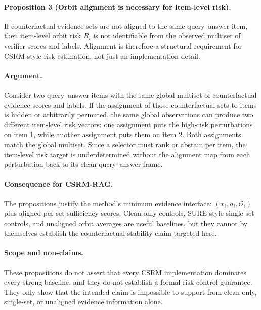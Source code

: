 \paragraph{Proposition 3 (Orbit alignment is necessary for item-level risk).}
\label{prop:orbit-alignment-necessary}
If counterfactual evidence sets are not aligned to the same query--answer item,
then item-level orbit risk $R_i$ is not identifiable from the observed multiset
of verifier scores and labels.  Alignment is therefore a structural requirement
for CSRM-style risk estimation, not just an implementation detail.

\paragraph{Argument.}
Consider two query--answer items with the same global multiset of
counterfactual evidence scores and labels.  If the assignment of those
counterfactual sets to items is hidden or arbitrarily permuted, the same global
observations can produce two different item-level risk vectors: one assignment
puts the high-risk perturbations on item 1, while another assignment puts them
on item 2.  Both assignments match the global multiset.  Since a selector must
rank or abstain per item, the item-level risk target is underdetermined without
the alignment map from each perturbation back to its clean query--answer frame.

\paragraph{Consequence for CSRM-RAG.}
The propositions justify the method's minimum evidence interface:
$(x_i,a_i,\mathcal{O}_i)$ plus aligned per-set sufficiency scores.  Clean-only
controls, SURE-style single-set controls, and unaligned orbit averages are useful
baselines, but they cannot by themselves establish the counterfactual stability
claim targeted here.

\paragraph{Scope and non-claims.}
These propositions do not assert that every CSRM implementation dominates every
strong baseline, and they do not establish a formal risk-control guarantee.
They only show that the intended claim is impossible to support from clean-only,
single-set, or unaligned evidence information alone.
